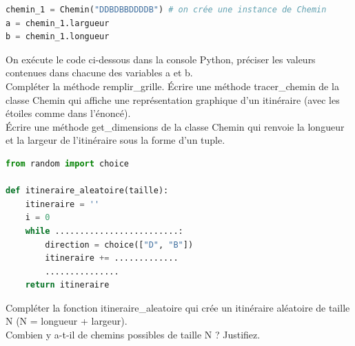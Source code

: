 \begin{Exercise}[title={POO - Itinéraire}]
    \begin{lstlisting}[language=Python]
chemin_1 = Chemin("DDBDBBDDDDB") # on crée une instance de Chemin
a = chemin_1.largueur
b = chemin_1.longueur
    \end{lstlisting}
    \Question On exécute le code ci-dessous dans la console Python, préciser les valeurs contenues dans chacune des variables a et b.\\
    \vfill
    \emptybox{1cm}
    \Question Compléter la méthode remplir\_grille.
    \Question Écrire une méthode tracer\_chemin de la classe Chemin qui affiche une
représentation graphique d’un itinéraire (avec les étoiles comme dans l'énoncé).\\
    \vfill
    \emptybox{5cm}
    \Question Écrire une méthode get\_dimensions de la classe Chemin qui renvoie la
longueur et la largeur de l’itinéraire sous la forme d’un tuple.\\
    \vfill
    \emptybox{5cm}


\begin{lstlisting}[language=Python]
from random import choice

def itineraire_aleatoire(taille):
    itineraire = ''
    i = 0
    while .........................:
        direction = choice(["D", "B"])
        itineraire += .............
        ...............
    return itineraire
\end{lstlisting}
    \Question Compléter la fonction itineraire\_aleatoire qui crée un itinéraire aléatoire de taille N (N = longueur + largeur).\\
    \Question Combien y a-t-il de chemins possibles de taille N ? Justifiez.\\
    \vfill
    \emptybox{2cm}
\end{Exercise}
